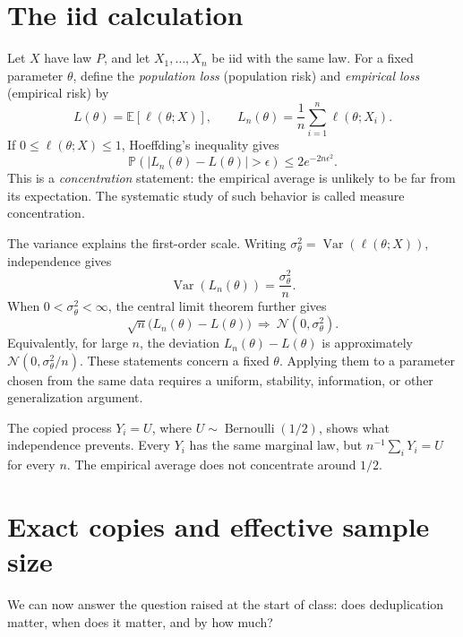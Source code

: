 \documentclass[11pt,twoside]{article}
\newcommand{\E}{\mathbb E}
\renewcommand{\P}{\mathbb P}
\theoremstyle{definition}
\theoremstyle{remark}
\begin{document}
\section{The iid calculation}
\label{sec:iid}

Let \(X\) have law \(P\), and let \(X_1,\ldots,X_n\) be iid with the same
law. For a fixed parameter
\(\theta\), define the \emph{population loss} (population risk) and
\emph{empirical loss} (empirical risk) by
\begin{equation}
 L(\theta)=\E[\ell(\theta;X)],
 \qquad
 L_n(\theta)=\frac1n\sum_{i=1}^n\ell(\theta;X_i).
 \label{eq:risks}
\end{equation}
If \(0\leq\ell(\theta;X)\leq1\), Hoeffding's inequality gives
\begin{equation}
 \P\!\left(\left|L_n(\theta)-L(\theta)\right|>\epsilon\right)
 \leq 2e^{-2n\epsilon^2}.
 \label{eq:hoeffding}
\end{equation}
This is a \emph{concentration} statement: the empirical average is unlikely to
be far from its expectation. The systematic study of such behavior is called
measure concentration.

The variance explains the first-order scale. Writing
\(\sigma_\theta^2=\operatorname{Var}(\ell(\theta;X))\), independence gives
\begin{equation}
 \operatorname{Var}(L_n(\theta))
 =\frac{\sigma_\theta^2}{n}.
 \label{eq:iid-variance}
\end{equation}
When \(0<\sigma_\theta^2<\infty\), the central limit theorem further gives
\[
 \sqrt n\bigl(L_n(\theta)-L(\theta)\bigr)
 \ \Longrightarrow\ \mathcal N(0,\sigma_\theta^2).
\]
Equivalently, for large \(n\), the deviation
\(L_n(\theta)-L(\theta)\) is approximately
\(\mathcal N(0,\sigma_\theta^2/n)\).
These statements concern a fixed \(\theta\). Applying them to a parameter
chosen from the same data requires a uniform, stability, information, or other
generalization argument.

The copied process \(Y_i=U\), where
\(U\sim\operatorname{Bernoulli}(1/2)\), shows what independence prevents.
Every \(Y_i\) has the same marginal law, but
\(n^{-1}\sum_iY_i=U\) for every \(n\). The empirical average does not
concentrate around \(1/2\).

\section{Exact copies and effective sample size}
\label{sec:copies}

We can now answer the question raised at the start of class: does
deduplication matter, when does it matter, and by how much?
\end{document}
